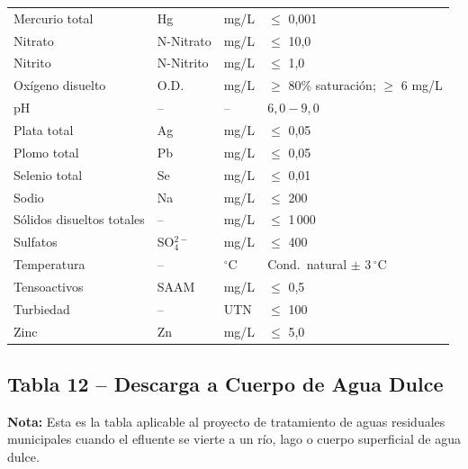 \documentclass[12pt,a4paper]{article}
\begin{document}
\begin{longtable}{p{4.5cm}p{2.0cm}p{2.0cm}p{3.5cm}}
Mercurio total & Hg & mg/L & $\leq$ 0,001 \\
Nitrato & N-Nitrato & mg/L & $\leq$ 10,0 \\
Nitrito & N-Nitrito & mg/L & $\leq$ 1,0 \\
Ox\'igeno disuelto & O.D. & mg/L & $\geq$ 80\% saturaci\'on; $\geq$ 6 mg/L \\
pH & -- & -- & $6,0 - 9,0$ \\
Plata total & Ag & mg/L & $\leq$ 0,05 \\
Plomo total & Pb & mg/L & $\leq$ 0,05 \\
Selenio total & Se & mg/L & $\leq$ 0,01 \\
Sodio & Na & mg/L & $\leq$ 200 \\
S\'olidos disueltos totales & -- & mg/L & $\leq$ 1\,000 \\
Sulfatos & SO$_4^{2-}$ & mg/L & $\leq$ 400 \\
Temperatura & -- & $^\circ$C & Cond.\ natural $\pm$ 3\,$^\circ$C \\
Tensoactivos & SAAM & mg/L & $\leq$ 0,5 \\
Turbiedad & -- & UTN & $\leq$ 100 \\
Zinc & Zn & mg/L & $\leq$ 5,0 \\
\end{longtable}

\subsection{Tabla 12 -- Descarga a Cuerpo de Agua Dulce}
\tiny

{\small\textbf{Nota:} Esta es la tabla aplicable al proyecto de tratamiento de aguas residuales municipales cuando el efluente se vierte a un r\'io, lago o cuerpo superficial de agua dulce.}

\vspace{6pt}
\end{document}
